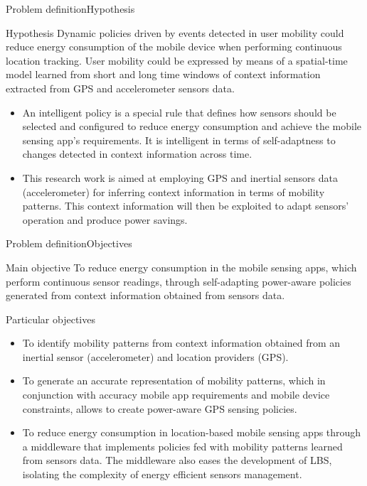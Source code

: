 \documentclass[9pt,xcolor={dvipsnames},handout]{beamer}
\begin{document}
\begin{frame}{Problem definition}{Hypothesis}
\begin{exampleblock}{Hypothesis}
Dynamic policies driven by events detected in user mobility could reduce energy consumption of the mobile device when performing continuous location tracking.
User mobility could be expressed by means of a spatial-time model learned from short and long time windows of context information extracted from GPS and accelerometer sensors data.
\end{exampleblock}
{
\small
\pause
\begin{itemize}
  \item An intelligent policy is a special rule that defines how sensors should be selected and configured to reduce energy consumption and achieve the mobile sensing app's requirements.
  It is intelligent in terms of self-adaptness to changes detected in context information across time.
  \pause
  \item This research work is aimed at employing GPS and inertial sensors data (accelerometer) for inferring context information in terms of mobility patterns.
  This context information will then be exploited to adapt sensors' operation and produce power savings.
\end{itemize}
}
\end{frame}

\begin{frame}{Problem definition}{Objectives}
\begin{exampleblock}{Main objective}
To reduce energy consumption in the mobile sensing apps, which perform continuous sensor readings, through self-adapting power-aware policies generated from context information obtained from sensors data.
\end{exampleblock}
\pause

\begin{exampleblock}{Particular objectives}
\begin{itemize}
  \item To identify mobility patterns from context information obtained from an inertial sensor (accelerometer) and location providers (GPS).
  \pause
  \item To generate an accurate representation of mobility patterns, which in conjunction with accuracy mobile app requirements and mobile device constraints, allows to create power-aware GPS sensing policies.
  \pause
  \item To reduce energy consumption in location-based mobile sensing apps through a middleware that implements policies fed with mobility patterns learned from sensors data. 
  The middleware also eases the development of LBS, isolating the complexity of energy efficient sensors management.
\end{itemize}
\end{exampleblock}
\end{frame}
\end{document}
